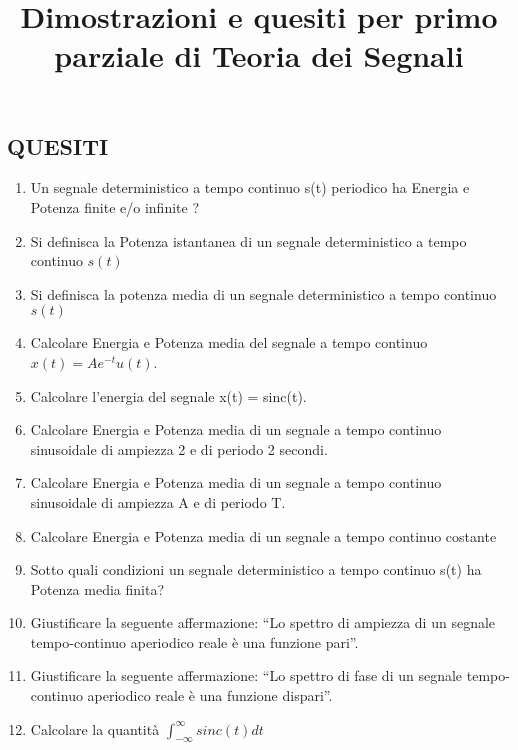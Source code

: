 \documentclass[
]{article}
\title{Dimostrazioni e quesiti per primo parziale di Teoria dei Segnali}
\author{}
\date{}
\begin{document}
	\maketitle

\hypertarget{quesiti}{%
\subsection{QUESITI}\label{quesiti}}

\begin{enumerate}
\def\labelenumi{\arabic{enumi}.}

\item
	Un segnale deterministico a tempo continuo s(t) periodico ha Energia e Potenza finite e/o infinite ?
	
\item
Si definisca la Potenza istantanea di un segnale deterministico a
tempo continuo $s(t)$

\item 
Si definisca la potenza media di un segnale deterministico a tempo continuo $s(t)$

\item
Calcolare Energia e Potenza media del segnale a tempo continuo
\(x(t) = Ae ^{-t} u(t)\).

\item
Calcolare l'energia del segnale x(t) = sinc(t).

\item
Calcolare Energia e Potenza media di un segnale a tempo continuo
sinusoidale di ampiezza 2 e di periodo 2 secondi.
\item
Calcolare Energia e Potenza media di un segnale a tempo continuo
sinusoidale di ampiezza A e di periodo T.

\item
Calcolare Energia e Potenza media di un segnale a tempo continuo
costante

\item 
Sotto quali condizioni un segnale deterministico a tempo continuo s(t) ha Potenza media finita?

\item
Giustificare la seguente affermazione: ``Lo spettro di ampiezza di un
segnale tempo-continuo aperiodico reale è una funzione pari''.

\item
Giustificare la seguente affermazione: ``Lo spettro di fase di un
	segnale tempo-continuo aperiodico reale è una funzione dispari''.


\item
Calcolare la quantità
\(\displaystyle \int_{- \infty}^{\infty} sinc(t) dt\)
	

\end{enumerate}
\end{document}
